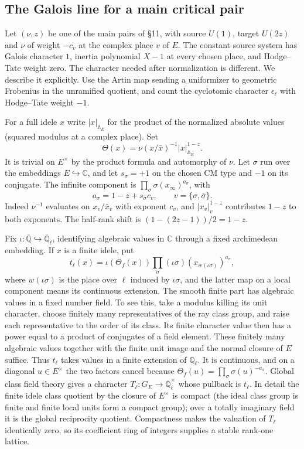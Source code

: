 \subsection{The Galois line for a main critical pair}
\label{rankone:main}
Let $(\nu,z)$ be one of the main pairs of \S11, with source $U(1)$, target $U(2z)$ and $\nu$ of weight $-c_v$ at the complex place $v$ of $E$. The constant source system has Galois character $1$, inertia polynomial $X-1$ at every chosen place, and Hodge--Tate weight zero. The character needed after normalization is different. We describe it explicitly. Use the Artin map sending a uniformizer to geometric Frobenius in the unramified quotient, and count the cyclotomic character $\epsilon_\ell$ with Hodge--Tate weight $-1$.

For a full idele $x$ write $|x|_{\mathbb A_E}$ for the product of the normalized absolute values (squared modulus at a complex place). Set
\[
 \Theta(x)=\nu(x/\bar x)^{-1}|x|_{\mathbb A_E}^{1-z}.
\]
It is trivial on $E^\times$ by the product formula and automorphy of $\nu$. Let $\sigma$ run over the embeddings $E\hookrightarrow\mathbb C$, and let $s_\sigma=+1$ on the chosen CM type and $-1$ on its conjugate. The infinite component is $\prod_\sigma\sigma(x_\infty)^{a_\sigma}$, with
\[
 a_\sigma=1-z+s_\sigma c_v,\qquad v=\{\sigma,\bar\sigma\}.
\]
Indeed $\nu^{-1}$ evaluates on $x_v/\bar x_v$ with exponent $c_v$, and $|x_v|_v^{1-z}$ contributes $1-z$ to both exponents. The half-rank shift is $(1-(2z-1))/2=1-z$.

Fix $\iota:\overline{\mathbb Q}\hookrightarrow\overline{\mathbb Q}_\ell$, identifying algebraic values in $\mathbb C$ through a fixed archimedean embedding. If $x$ is a finite idele, put
\[
 t_\ell(x)=\iota(\Theta_f(x))
        \prod_{\sigma} (\iota\sigma)(x_{w(\iota\sigma)})^{a_\sigma},
\]
where $w(\iota\sigma)$ is the place over $\ell$ induced by $\iota\sigma$, and the latter map on a local component means its continuous extension. The smooth finite part has algebraic values in a fixed number field. To see this, take a modulus killing its unit character, choose finitely many representatives of the ray class group, and raise each representative to the order of its class. Its finite character value then has a power equal to a product of conjugates of a field element. These finitely many algebraic values together with the finite unit image and the normal closure of $E$ suffice. Thus $t_\ell$ takes values in a finite extension of $\mathbb Q_\ell$. It is continuous, and on a diagonal $u\in E^\times$ the two factors cancel because $\Theta_f(u)=\prod_\sigma\sigma(u)^{-a_\sigma}$. Global class field theory gives a character $T_\ell:G_E\to\overline{\mathbb Q}_\ell^\times$ whose pullback is $t_\ell$. In detail the finite idele class quotient by the closure of $E^\times$ is compact (the ideal class group is finite and finite local units form a compact group); over a totally imaginary field it is the global reciprocity quotient. Compactness makes the valuation of $T_\ell$ identically zero, so its coefficient ring of integers supplies a stable rank-one lattice.

